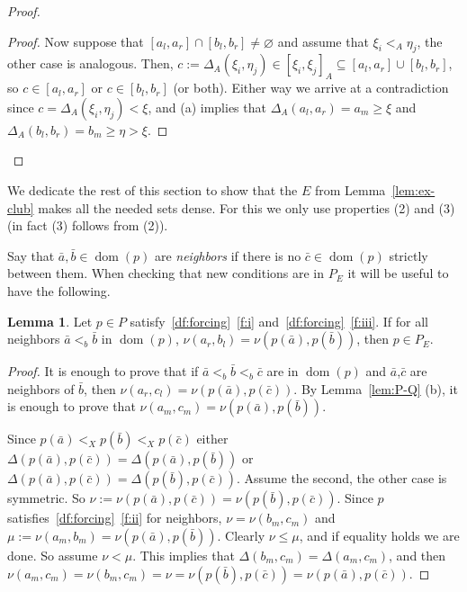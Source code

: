 \documentclass[10pt]{amsart}
\theoremstyle{definition}
\newtheorem{lemma}[theorem]{Lemma}
\theoremstyle{remark}
\newcommand{\es}{\varnothing}
\newcommand{\seb}{\subseteq}
\newcommand{\ba}{\bar{a}}
\newcommand{\bb}{\bar{b}}
\newcommand{\bc}{\bar{c}}
\newcommand{\1}{\mathbbm{1}}
\DeclareMathOperator{\dom}{dom}
\begin{document}
\begin{proof}
\begin{proof}
    Now suppose that $[a_{l},a_{r}] \cap [b_{l},b_{r}] \neq \es$
    and assume that $\xi_{i} <_{A} \eta_{j}$, the other case is analogous.
    Then, $c := \Delta_{A}(\xi_{i},\eta_{j}) \in {[\xi_{i},\xi_{j}]}_{A}
    \seb [a_{l},a_{r}] \cup [b_{l},b_{r}]$, so $c \in [a_{l},a_{r}]$
    or $c \in [b_{l},b_{r}]$ (or both). Either way we arrive at a contradiction
    since $c = \Delta_{A}(\xi_{i},\eta_{j}) < \xi$, and (a) implies
    that $\Delta_{A}(a_{l},a_{r}) = a_{m} \ge \xi$ and
    $\Delta_{A}(b_{l},b_{r}) = b_{m} \ge \eta > \xi$.
  \end{proof}
\end{proof}

We dedicate the rest of this section to show that the $E$ from
 Lemma~\ref{lem:ex-club} makes all the needed sets dense. For this
we only use properties (2) and (3) (in fact (3) follows from (2)).

Say that $\ba,
\bb \in \dom(p)$ are \emph{neighbors} if there is no $\bar{c} \in
\dom(p)$ strictly between them. When checking that new conditions are
in $P_{E}$ it will be useful to have the following.

\begin{lemma}\label{lem:neighbors}
  Let $p \in P$ satisfy~\ref{df:forcing}~\ref{f:i}
  and~\ref{df:forcing}~\ref{f:iii}. If
  for all neighbors $\ba <_{b} \bb$ in $\dom(p)$,
  $\nu(a_{r},b_{l}) = \nu(p(\ba),p(\bb))$, then $p \in P_{E}$.
\end{lemma}
\begin{proof}
  It is enough to prove that if $\ba <_{b} \bb <_{b} \bc$ are in
  $\dom(p)$ and $\ba$,$\bc$ are neighbors of $\bb$,
  then $\nu(a_{r},c_{l}) = \nu(p(\ba),p(\bc))$. By Lemma~\ref{lem:P-Q}
  (b), it is enough to prove that $\nu(a_{m},c_{m}) = \nu(p(\ba),p(\bb))$.

  Since $p(\ba) <_{X} p(\bb) <_{X} p(\bc)$ either
  $\Delta(p(\ba),p(\bc)) = \Delta(p(\ba),p(\bb))$ or
  $\Delta(p(\ba),p(\bc)) = \Delta(p(\bb),p(\bc))$. Assume
  the second, the other case is symmetric. So $\nu :=
  \nu(p(\ba),p(\bc)) = \nu(p(\bb),p(\bc))$. Since $p$
  satisfies~\ref{df:forcing}~\ref{f:ii}
  for neighbors, $\nu = \nu(b_{m},c_{m})$ and
  $\mu := \nu(a_{m},b_{m}) = \nu(p(\ba),p(\bb))$. Clearly $\nu \le \mu$,
  and if equality holds we are done. So assume
  $\nu < \mu$. This implies that $\Delta(b_{m},c_{m}) = \Delta(a_{m},c_{m})$,
  and then $\nu(a_{m},c_{m}) = \nu(b_{m},c_{m}) = \nu = \nu(p(\bb),p(\bc)) =
  \nu(p(\ba),p(\bc))$.
\end{proof}
\end{document}

